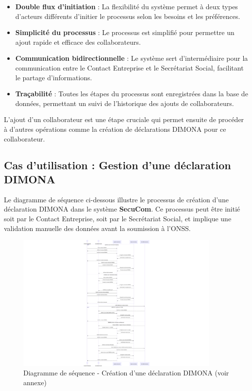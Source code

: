 \begin{itemize}
  \item \textbf{Double flux d'initiation} : La flexibilité du système permet à deux types d'acteurs différents d'initier le processus selon les besoins et les préférences.
  \item \textbf{Simplicité du processus} : Le processus est simplifié pour permettre un ajout rapide et efficace des collaborateurs.
  \item \textbf{Communication bidirectionnelle} : Le système sert d'intermédiaire pour la communication entre le Contact Entreprise et le Secrétariat Social, facilitant le partage d'informations.
  \item \textbf{Traçabilité} : Toutes les étapes du processus sont enregistrées dans la base de données, permettant un suivi de l'historique des ajouts de collaborateurs.
\end{itemize}

L'ajout d'un collaborateur est une étape cruciale qui permet ensuite de procéder à d'autres opérations comme la création de déclarations DIMONA pour ce collaborateur.

\newpage
\subsection{Cas d'utilisation : Gestion d'une déclaration DIMONA}

\noindent Le diagramme de séquence ci-dessous illustre le processus de création d'une déclaration DIMONA dans le système \textbf{SecuCom}. Ce processus peut être initié soit par le Contact Entreprise, soit par le Secrétariat Social, et implique une validation manuelle des données avant la soumission à l'ONSS.

\begin{figure}[H]
\centering
\includegraphics[width=0.9\textwidth]{SD_creation_dimona.png}
\caption{Diagramme de séquence - Création d'une déclaration DIMONA (voir annexe)}
\end{figure}


